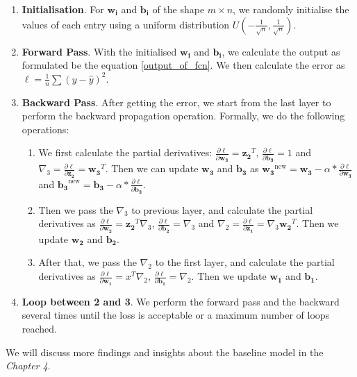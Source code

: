 \begin{enumerate}
	\item \textbf{Initialisation}. For $\boldsymbol{w_i}$ and $\boldsymbol{b_i}$ of the shape $m\times n$, we randomly initialise the values of each entry using a uniform distribution $U(-\frac{1}{\sqrt{n}}, \frac{1}{\sqrt{n}})$.
	\item \textbf{Forward Pass}. With the initialised $\boldsymbol{w_i}$ and $\boldsymbol{b_i}$, we calculate the output as formulated be the equation \ref{output_of_fcn}. We then calculate the error as $\ell=\frac{1}{n}\sum(y-\hat{y})^2$.
	\item \textbf{Backward Pass}. After getting the error, we start from the last layer to perform the backward propagation operation. Formally, we do the following operations:
	\begin{enumerate}
		\item We first calculate the partial derivatives: $\frac{\partial \ell}{\partial\boldsymbol{w_3}}=\boldsymbol{z_2}^T$, $\frac{\partial \ell}{\partial\boldsymbol{b_3}}=1$ and \\ $\nabla_3=\frac{\partial \ell}{\partial\boldsymbol{z_2}}=\boldsymbol{w_3}^T$. Then we can update $\boldsymbol{w_3}$ and $\boldsymbol{b_3}$ as $\boldsymbol{w_3}^{\text{new}}=\boldsymbol{w_3}-\alpha*\frac{\partial \ell}{\partial\boldsymbol{w_3}}$ and $\boldsymbol{b_3}^{\text{new}}=\boldsymbol{b_3}-\alpha*\frac{\partial \ell}{\partial\boldsymbol{b_3}}$.
		\item Then we pass the $\nabla_3$ to previous layer, and calculate the partial derivatives as $\frac{\partial \ell}{\partial\boldsymbol{w_2}}=\boldsymbol{z_2}^T\nabla_3$, $\frac{\partial \ell}{\partial\boldsymbol{b_2}}=\nabla_3$ and $\nabla_2=\frac{\partial \ell}{\partial\boldsymbol{z_1}}=\nabla_3\boldsymbol{w_2}^T$. Then we update $\boldsymbol{w_2}$ and $\boldsymbol{b_2}$.
		\item After that, we pass the $\nabla_2$ to the first layer, and calculate the partial derivatives as $\frac{\partial \ell}{\partial\boldsymbol{w_1}}=x^T\nabla_2$, $\frac{\partial \ell}{\partial\boldsymbol{b_1}}=\nabla_2$. Then we update $\boldsymbol{w_1}$ and $\boldsymbol{b_1}$.
	\end{enumerate}
	\item \textbf{Loop between 2 and 3}. We perform the forward pass and the backward several times until the loss is acceptable or a maximum number of loops reached.
\end{enumerate}

We will discuss more findings and insights about the baseline model in the \textit{Chapter 4}.









